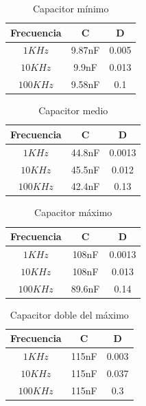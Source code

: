 \documentclass[../../main.tex]{subfiles}
\begin{document}
\begin{table}[H]
\begin{center}
\begin{tabular}{|c|c|c|}
\hline
 Frecuencia&C&D\\
\hline \hline

$ 1KHz$ &9.87nF&0.005  \\ \hline
$ 10KHz$  & 9.9nF&0.013  \\ \hline
$ 100KHz$  &9.58nF &0.1  \\ \hline

\end{tabular}
\caption{Capacitor m\'inimo } 
\end{center}
\end{table}
\begin{table}[H]
\begin{center}
\begin{tabular}{|c|c|c|}
\hline
 Frecuencia&C&D\\
\hline \hline

$ 1KHz$ &44.8nF&0.0013  \\ \hline
$ 10KHz$  & 45.5nF&0.012 \\ \hline
$ 100KHz$  &42.4nF &0.13  \\ \hline

\end{tabular}
\caption{Capacitor medio } 
\end{center}
\end{table}

\begin{table}[H]
\begin{center}
\begin{tabular}{|c|c|c|}
\hline
 Frecuencia&C&D\\
\hline \hline

$ 1KHz$ &108nF&0.0013  \\ \hline
$ 10KHz$  & 108nF&0.013  \\ \hline
$ 100KHz$  &89.6nF & 0.14 \\ \hline

\end{tabular}
\caption{Capacitor m\'aximo } 
\end{center}
\end{table}

\begin{table}[H]
\begin{center}
\begin{tabular}{|c|c|c|}
\hline
 Frecuencia&C&D\\
\hline \hline

$ 1KHz$ &115nF&0.003  \\ \hline
$ 10KHz$  & 115nF&0.037  \\ \hline
$ 100KHz$  &115nF &0.3  \\ \hline

\end{tabular}
\caption{Capacitor doble del m\'aximo } 
\end{center}
\end{table}
\end{document}
